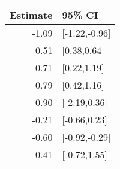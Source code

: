 \begin{tabular}{rl}
  \hline
Estimate & 95\% CI \\ 
  \hline
-1.09 & [-1.22,-0.96] \\ 
  0.51 & [0.38,0.64] \\ 
  0.71 & [0.22,1.19] \\ 
  0.79 & [0.42,1.16] \\ 
  -0.90 & [-2.19,0.36] \\ 
  -0.21 & [-0.66,0.23] \\ 
  -0.60 & [-0.92,-0.29] \\ 
  0.41 & [-0.72,1.55] \\ 
   \hline
\end{tabular}

